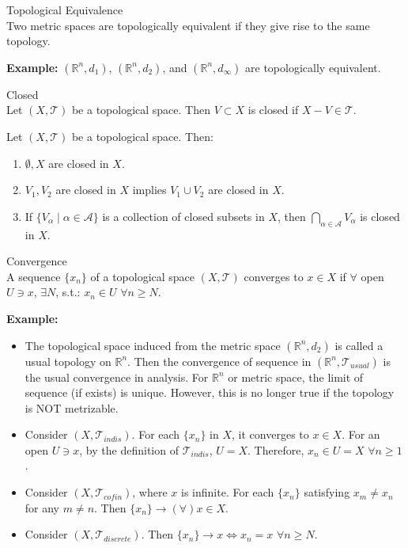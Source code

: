 \begin{definition}{Topological Equivalence}\\
Two metric spaces are topologically equivalent if they give rise to the same topology.
\end{definition}

\noindent\textbf{Example:} 
$(\mathbb{R}^n,d_1)$, $(\mathbb{R}^n,d_2)$, and $(\mathbb{R}^n,d_\infty)$ are topologically equivalent.

\begin{definition}{Closed}\\
Let $(X, \mathcal{T})$ be a topological space. Then $V\subset X$ is closed if $X-V \in \mathcal{T}$.
\end{definition}

\begin{proposition}
    Let $(X,\mathcal{T})$ be a topological space. Then:
    \begin{enumerate}
        \item $\emptyset,X$ are closed in $X$.
        \item $V_1,V_2$ are closed in $X$ implies $V_1\cup V_2$ are closed in $X$.
        \item If $\{V_\alpha \mid \alpha \in \mathcal{A}\}$ is a collection of closed subsets in $X$, then $\bigcap_{\alpha \in \mathcal{A}}V_\alpha$ is closed in $X$.
    \end{enumerate}
\end{proposition}

\begin{definition}{Convergence}\\
A sequence $\{x_n\}$ of a topological space $(X,\mathcal{T})$ converges to $x \in X$ if $\forall$ open $U \ni x$, $\exists N$, s.t.: $x_n \in U$ $\forall n\geq N$.
\end{definition}

\noindent\textbf{Example:}
\begin{itemize}
    \item The topological space induced from the metric space $(\mathbb{R}^n,d_2)$ is called a usual topology on $\mathbb{R}^n$. Then the convergence of sequence in $(\mathbb{R}^n, \mathcal{T}_{usual})$ is the usual convergence in analysis. For $\mathbb{R}^n$ or metric space, the limit of sequence (if exists) is unique. However, this is no longer true if the topology is NOT metrizable.
    \item Consider $(X,\mathcal{T}_{indis})$. For each $\{x_n\}$ in $X$, it converges to $x\in X$. For an open $U \ni x$, by the definition of $\mathcal{T}_{indis}$, $U= X$. Therefore, $x_n \in  U = X$ $\forall n \geq1$.
    \item Consider $(X,\mathcal{T}_{cofin})$, where $x$ is infinite. For each $\{x_n\}$ satisfying $x_m \neq x_n$ for any $m \neq n$. Then $\{x_n\} \rightarrow (\forall) x \in X$.
    \item Consider $(X, \mathcal{T}_{discrete})$. Then $\{x_n\} \rightarrow x \Leftrightarrow x_n=x$ $\forall n \geq N$.
\end{itemize}

